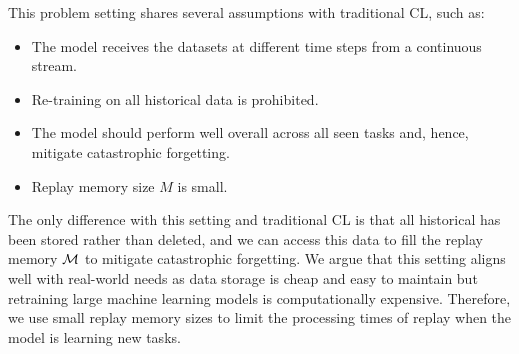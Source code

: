 This problem setting shares several assumptions with traditional CL, such as:
\begin{itemize}[noitemsep,topsep=1pt]
	\item The model receives the datasets at different time steps from a continuous stream.
	\item Re-training on all historical data is prohibited.
	\item The model should perform well overall across all seen tasks and, hence, mitigate catastrophic forgetting.
	\item Replay memory size $M$ is small.
\end{itemize}
The only difference with this setting and traditional CL is that all historical has been stored rather than deleted, and we can access this data to fill the replay memory ${\mathcal{M}}$ to mitigate catastrophic forgetting. We argue that this setting aligns well with real-world needs as data storage is cheap and easy to maintain but retraining large machine learning models is computationally expensive. Therefore, we use small replay memory sizes to limit the processing times of replay when the model is learning new tasks. 





